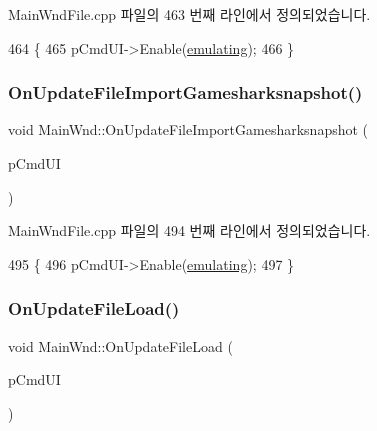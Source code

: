 Main\+Wnd\+File.\+cpp 파일의 463 번째 라인에서 정의되었습니다.


\begin{DoxyCode}
464 \{
465   pCmdUI->Enable(\mbox{\hyperlink{_main_wnd_file_8cpp_af9cc36078b1b311753963297ae7f2a74}{emulating}});  
466 \}
\end{DoxyCode}
\mbox{\label{class_main_wnd_a12a769f8883bf0abc2e51764b6969ecd}} 
\subsubsection{\texorpdfstring{On\+Update\+File\+Import\+Gamesharksnapshot()}{OnUpdateFileImportGamesharksnapshot()}}
{\footnotesize\ttfamily void Main\+Wnd\+::\+On\+Update\+File\+Import\+Gamesharksnapshot (\begin{DoxyParamCaption}\item[{C\+Cmd\+UI $\ast$}]{p\+Cmd\+UI }\end{DoxyParamCaption})\hspace{0.3cm}{\ttfamily [protected]}}



Main\+Wnd\+File.\+cpp 파일의 494 번째 라인에서 정의되었습니다.


\begin{DoxyCode}
495 \{
496   pCmdUI->Enable(\mbox{\hyperlink{_main_wnd_file_8cpp_af9cc36078b1b311753963297ae7f2a74}{emulating}});  
497 \}
\end{DoxyCode}
\mbox{\label{class_main_wnd_acb0b11e80174e75041bf222d5025e860}} 
\subsubsection{\texorpdfstring{On\+Update\+File\+Load()}{OnUpdateFileLoad()}}
{\footnotesize\ttfamily void Main\+Wnd\+::\+On\+Update\+File\+Load (\begin{DoxyParamCaption}\item[{C\+Cmd\+UI $\ast$}]{p\+Cmd\+UI }\end{DoxyParamCaption})\hspace{0.3cm}{\ttfamily [protected]}}



